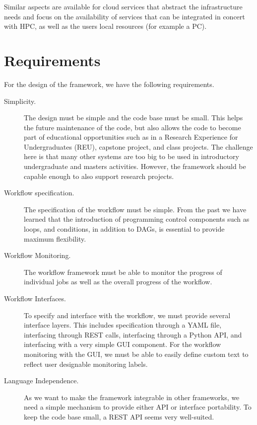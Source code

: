 Similar aspects are available for cloud services that abstract the infrastructure needs and focus on the availability of services that can be integrated in concert with HPC, as well as the users local resources (for example a PC).




% 


\section{Requirements}

For the design of the framework, we have the following requirements.

\begin{description}

\item[Simplicity.] The design must be simple and the code base must be small.
This helps the future maintenance of the code, but also allows the code
to become part of educational opportunities such as in a Research
Experience for Undergraduates (REU), capstone project, and class
projects. The challenge here is that many other systems are too big to
be used in introductory undergraduate and masters activities.
However, the framework should be capable enough to also support research projects.

\item[Workflow specification.] The specification of the workflow must be simple.
From the past we have learned that the introduction of programming control
components such as loops, and conditions, in addition to DAGs, is
essential to provide maximum flexibility.

\item[Workflow Monitoring.] The workflow framework must be able to monitor the
progress of individual jobs as well as the overall progress of the workflow.

\item[Workflow Interfaces.] To specify and interface with the workflow, we
must provide several interface layers. This includes specification
through a YAML file, interfacing through REST calls, interfacing
through a Python API, and interfacing with a very simple GUI component.
For the workflow monitoring with the GUI, we must be able to easily
define custom text to reflect user designable monitoring labels.

\item[Language Independence.] As we want to make the framework integrable in
other frameworks, we need a simple mechanism to provide either API or
interface portability. To keep the code base small, a REST API seems
very well-suited.


\end{description}
